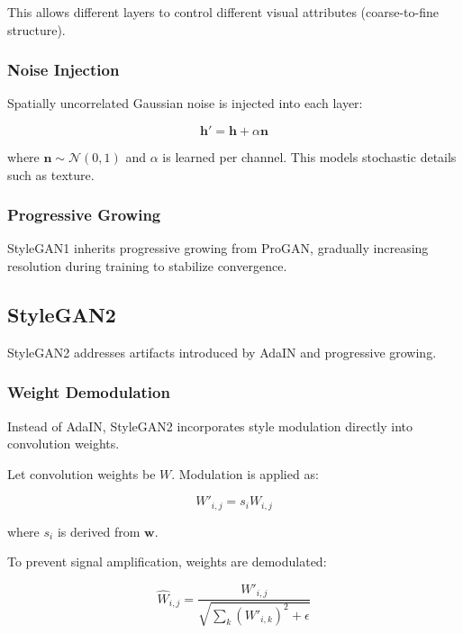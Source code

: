 This allows different layers to control different visual attributes (coarse-to-fine structure).

\subsubsection{Noise Injection}

Spatially uncorrelated Gaussian noise is injected into each layer:

\begin{equation}
\mathbf{h}' = \mathbf{h} + \alpha \mathbf{n}
\end{equation}

where $\mathbf{n} \sim \mathcal{N}(0,1)$ and $\alpha$ is learned per channel. This models stochastic details such as texture.

\subsubsection{Progressive Growing}

StyleGAN1 inherits progressive growing from ProGAN, gradually increasing resolution during training to stabilize convergence.

\bigskip

\subsection{StyleGAN2}

StyleGAN2 addresses artifacts introduced by AdaIN and progressive growing.

\subsubsection{Weight Demodulation}

Instead of AdaIN, StyleGAN2 incorporates style modulation directly into convolution weights.

Let convolution weights be $W$. Modulation is applied as:

\begin{equation}
W'_{i,j} = s_i W_{i,j}
\end{equation}

where $s_i$ is derived from $\mathbf{w}$.

To prevent signal amplification, weights are demodulated:

\begin{equation}
\hat{W}_{i,j} =
\frac{W'_{i,j}}
{\sqrt{\sum_k (W'_{i,k})^2 + \epsilon}}
\end{equation}


